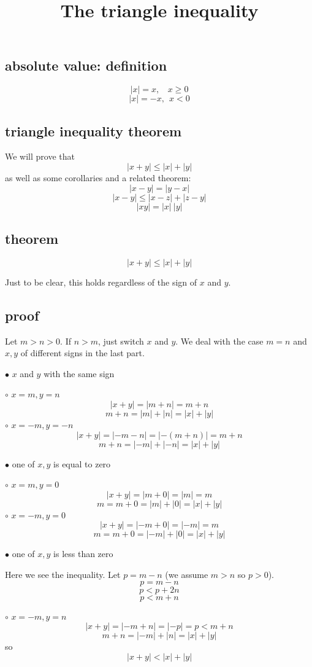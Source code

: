 \documentclass[11pt, oneside]{article}
\title{The triangle inequality}
\date{}
\begin{document}
\maketitle
\Large
\subsection*{absolute value:  definition}
\[ |x| = x, \ \ \ \ x \ge 0 \]
\[ |x| = -x, \ \ x < 0 \]

\subsection*{triangle inequality theorem}
We will prove that 
\[ |x + y| \le |x| + |y| \] 
as well as some corollaries and a related theorem:
\[ |x - y| = |y - x| \]
\[ |x - y| \le |x - z| + |z - y| \]
\[ |xy| = |x| \ |y| \]

\subsection*{theorem}
\[ |x + y| \le |x| + |y| \]

Just to be clear, this holds regardless of the sign of $x$ and $y$.

\subsection*{proof}
Let $m > n > 0$.  If $n > m$, just switch $x$ and $y$.  We deal with the case $m=n$ and $x,y$ of different signs in the last part.

$\bullet$  $x$ and $y$ with the same sign

$\circ$  $x = m, y = n$
\[ |x + y| = |m + n| = m + n \]
\[ m + n = |m| + |n| = |x| + |y| \]
$\circ$  $x = -m, y = -n$
\[ |x + y| = |-m - n| = |-(m + n)| = m + n \]
\[ m + n = |-m| + |-n| = |x| + |y| \]

$\bullet$  one of $x,y$ is equal to zero

$\circ$  $x = m, y = 0$
\[ |x + y| = |m + 0| = |m| = m \]
\[ m = m + 0 = |m| + |0| = |x| + |y| \]
$\circ$  $x = -m, y = 0$
\[ |x + y| = |-m + 0| = |-m| = m \]
\[ m = m + 0 = |-m| + |0| = |x| + |y| \]

$\bullet$  one of $x,y$ is less than zero

Here we see the inequality.  Let $p = m - n$ (we assume $m > n$ so $p > 0$).
\[ p = m - n \]
\[ p < p + 2n \]
\[ p < m + n \]

$\circ$  $x = -m, y = n$
\[ |x + y| = |-m + n| = |-p| = p < m + n \]
\[ m + n = |-m| + |n| = |x| + |y| \]
so
\[ |x + y| < |x| + |y| \]
\end{document}
